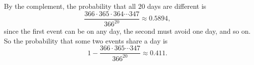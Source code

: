 By the complement, the probability that all $20$ days are different is
\[\dfrac{366\cdot365\cdot364\cdots347}{366^{20}}\approx0.5894,\]
since the first event can be on any day, the second must avoid one day, and so on. So the probability that some two events share a day is
\[\boxed{1-\dfrac{366\cdot365\cdots347}{366^{20}}\approx0.411}.\]
